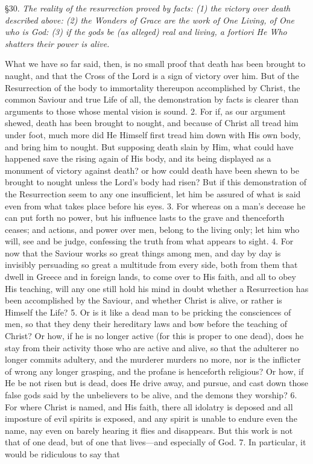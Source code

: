 
§30. \emph{The reality of the resurrection proved by facts: (1) the victory over death described above: (2) the Wonders of Grace are the work of One Living, of One who is God: (3) if the gods be (as alleged) real and living, a fortiori He Who shatters their power is alive.}

What we have so far said, then, is no small proof that death has been brought to naught, and that the Cross of the Lord is a sign of victory over him. But of the Resurrection of the body to immortality thereupon accomplished by Christ, the common Saviour and true Life of all, the demonstration by facts is clearer than arguments to those whose mental vision is sound. 2. For if, as our argument shewed, death has been brought to nought, and because of Christ all tread him under foot, much more did He Himself first tread him down with His own body, and bring him to nought. But supposing death slain by Him, what could have happened save the rising again of His body, and its being displayed as a monument of victory against death? or how could death have been shewn to be brought to nought unless the Lord’s body had risen? But if this demonstration of the Resurrection seem to any one insufficient, let him be assured of what is said even from what takes place before his eyes. 3. For whereas on a man’s decease he can put forth no power, but his influence lasts to the grave and thenceforth ceases; and actions, and power over men, belong to the living only; let him who will, see and be judge, confessing the truth from what appears to sight. 4. For now that the Saviour works so great things among men, and day by day is invisibly persuading so great a multitude from every side, both from them that dwell in Greece and in foreign lands, to come over to His faith, and all to obey His teaching, will any one still hold his mind in doubt whether a Resurrection has been accomplished by the Saviour, and whether Christ is alive, or rather is Himself the Life? 5. Or is it like a dead man to be pricking the consciences of men, so that they deny their hereditary laws and bow before the teaching of Christ? Or how, if he is no longer active (for this is proper to one dead), does he stay from their activity those who are active and alive, so that the adulterer no longer commits adultery, and the murderer murders no more, nor is the inflicter of wrong any longer grasping, and the profane is henceforth religious? Or how, if He be not risen but is dead, does He drive away, and pursue, and cast down those false gods said by the unbelievers to be alive, and the demons they worship? 6. For where Christ is named, and His faith, there all idolatry is deposed and all imposture of evil spirits is exposed, and any spirit is unable to endure even the name, nay even on barely hearing it flies and disappears. But this work is not that of one dead, but of one that lives—and especially of God. 7. In particular, it would be ridiculous to say that 